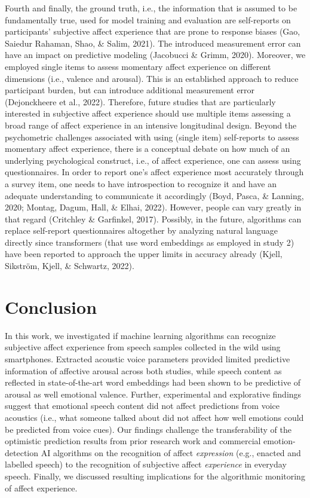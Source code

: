 \documentclass[
  english,
  man,floatsintext]{apa6}
\begin{document}
Fourth and finally, the ground truth, i.e., the information that is assumed to be fundamentally true, used for model training and evaluation are self-reports on participants' subjective affect experience that are prone to response biases (Gao, Saiedur Rahaman, Shao, \& Salim, 2021). The introduced measurement error can have an impact on predictive modeling (Jacobucci \& Grimm, 2020). Moreover, we employed single items to assess momentary affect experience on different dimensions (i.e., valence and arousal). This is an established approach to reduce participant burden, but can introduce additional measurement error (Dejonckheere et al., 2022). Therefore, future studies that are particularly interested in subjective affect experience should use multiple items assessing a broad range of affect experience in an intensive longitudinal design. Beyond the psychometric challenges associated with using (single item) self-reports to assess momentary affect experience, there is a conceptual debate on how much of an underlying psychological construct, i.e., of affect experience, one can assess using questionnaires. In order to report one's affect experience most accurately through a survey item, one needs to have introspection to recognize it and have an adequate understanding to communicate it accordingly (Boyd, Pasca, \& Lanning, 2020; Montag, Dagum, Hall, \& Elhai, 2022). However, people can vary greatly in that regard (Critchley \& Garfinkel, 2017). Possibly, in the future, algorithms can replace self-report questionnaires altogether by analyzing natural language directly since transformers (that use word embeddings as employed in study 2) have been reported to approach the upper limits in accuracy already (Kjell, Sikström, Kjell, \& Schwartz, 2022).

\hypertarget{conclusion}{%
\section{Conclusion}\label{conclusion}}

In this work, we investigated if machine learning algorithms can recognize subjective affect experience from speech samples collected in the wild using smartphones. Extracted acoustic voice parameters provided limited predictive information of affective arousal across both studies, while speech content as reflected in state-of-the-art word embeddings had been shown to be predictive of arousal as well emotional valence. Further, experimental and explorative findings suggest that emotional speech content did not affect predictions from voice acoustics (i.e., what someone talked about did not affect how well emotions could be predicted from voice cues). Our findings challenge the transferability of the optimistic prediction results from prior research work and commercial emotion-detection AI algorithms on the recognition of affect \emph{expression} (e.g., enacted and labelled speech) to the recognition of subjective affect \emph{experience} in everyday speech. Finally, we discussed resulting implications for the algorithmic monitoring of affect experience.
\end{document}
